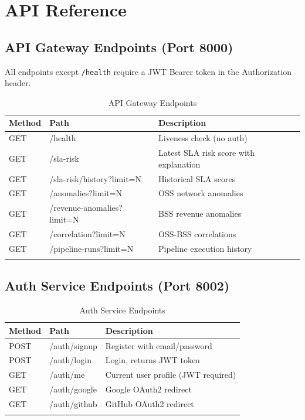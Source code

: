 \chapter{API Reference}
\label{app:api}

\section{API Gateway Endpoints (Port 8000)}

All endpoints except \texttt{/health} require a JWT Bearer token in the Authorization header.

\begin{longtable}{@{}llp{6cm}@{}}
\toprule
\textbf{Method} & \textbf{Path} & \textbf{Description} \\
\midrule
\endhead
GET & /health & Liveness check (no auth) \\
GET & /sla-risk & Latest SLA risk score with explanation \\
GET & /sla-risk/history?limit=N & Historical SLA scores \\
GET & /anomalies?limit=N & OSS network anomalies \\
GET & /revenue-anomalies?limit=N & BSS revenue anomalies \\
GET & /correlation?limit=N & OSS-BSS correlations \\
GET & /pipeline-runs?limit=N & Pipeline execution history \\
\bottomrule
\caption{API Gateway Endpoints}
\label{tab:api-endpoints}
\end{longtable}

\section{Auth Service Endpoints (Port 8002)}

\begin{longtable}{@{}llp{6cm}@{}}
\toprule
\textbf{Method} & \textbf{Path} & \textbf{Description} \\
\midrule
\endhead
POST & /auth/signup & Register with email/password \\
POST & /auth/login & Login, returns JWT token \\
GET & /auth/me & Current user profile (JWT required) \\
GET & /auth/google & Google OAuth2 redirect \\
GET & /auth/github & GitHub OAuth2 redirect \\
\bottomrule
\caption{Auth Service Endpoints}
\label{tab:auth-endpoints}
\end{longtable}

